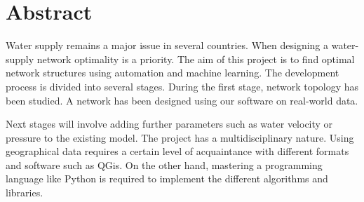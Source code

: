 \newpage
\chapter*{Abstract}



Water supply remains a major issue in several countries. When designing a water-supply network optimality is a priority. The aim of this project is to find optimal network structures using automation and machine learning. The development process is divided into several stages. During the first stage, network topology has been studied. A network has been designed using our software on real-world data. 

\vspace{0.5cm}
\noindent Next stages will involve adding further parameters such as water velocity or pressure to the existing model. The project has a multidisciplinary nature. Using geographical data requires a certain level of acquaintance with different formats and software such as QGis. On the other hand, mastering a programming language like Python is required to implement the different algorithms and libraries.